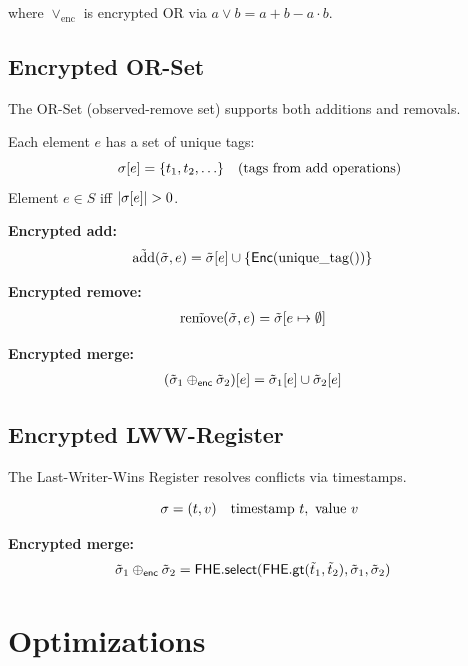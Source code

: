 \documentclass{../shared/luxfhe}
\begin{document}
where $\vee_{\text{enc}}$ is encrypted OR via $a \vee b = a + b - a \cdot b$.

\subsection{Encrypted OR-Set}

The OR-Set (observed-remove set) supports both additions and removals.

\begin{definition}
Each element $e$ has a set of unique tags:
\[
\sigma[e] = \{t_1, t_2, \ldots\} \quad \text{(tags from add operations)}
\]
Element $e \in S$ iff $|\sigma[e]| > 0$.
\end{definition}

\textbf{Encrypted add:}
\begin{align}
\tilde{\text{add}}(\tilde{\sigma}, e) &= \tilde{\sigma}[e] \cup \{\mathsf{Enc}(\text{unique\_tag}())\}
\end{align}

\textbf{Encrypted remove:}
\begin{align}
\tilde{\text{remove}}(\tilde{\sigma}, e) &= \tilde{\sigma}[e \mapsto \emptyset]
\end{align}

\textbf{Encrypted merge:}
\begin{align}
(\tilde{\sigma}_1 \oplus_{\mathsf{enc}} \tilde{\sigma}_2)[e] &= \tilde{\sigma}_1[e] \cup \tilde{\sigma}_2[e]
\end{align}

\subsection{Encrypted LWW-Register}

The Last-Writer-Wins Register resolves conflicts via timestamps.

\begin{definition}
\[
\sigma = (t, v) \quad \text{timestamp } t, \text{ value } v
\]
\end{definition}

\textbf{Encrypted merge:}
\begin{align}
\tilde{\sigma}_1 \oplus_{\mathsf{enc}} \tilde{\sigma}_2 &= \mathsf{FHE.select}(\mathsf{FHE.gt}(\tilde{t}_1, \tilde{t}_2), \tilde{\sigma}_1, \tilde{\sigma}_2)
\end{align}

\section{Optimizations}
\end{document}
